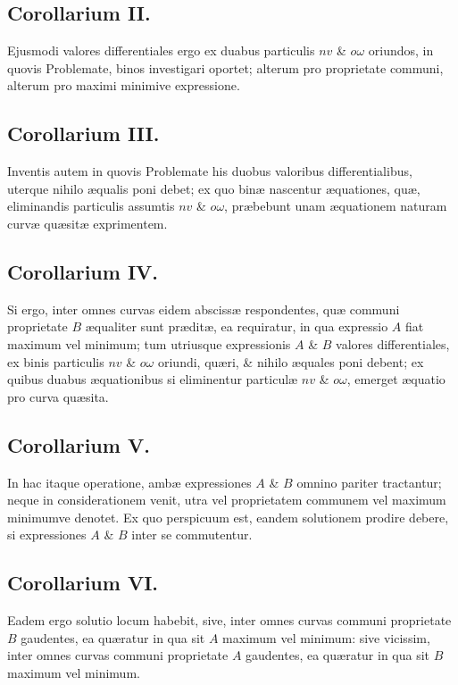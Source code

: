 \subsection*{Corollarium II.}
Ejusmodi valores differentiales ergo ex duabus particulis $nv$ \& $o\omega$ oriundos, in quovis Problemate, binos investigari oportet; alterum pro proprietate communi, alterum pro maximi minimive expressione.

\subsection*{Corollarium III.}
Inventis autem in quovis Problemate his duobus valoribus differentialibus, uterque nihilo æqualis poni debet; ex quo binæ nascentur æquationes, quæ, eliminandis particulis assumtis $nv$ \& $o\omega$, præbebunt unam æquationem naturam curvæ quæsitæ exprimentem.

\subsection*{Corollarium IV.}
Si ergo, inter omnes curvas eidem abscissæ respondentes, quæ communi proprietate $B$ æqualiter sunt præditæ, ea requiratur, in qua expressio $A$ fiat maximum vel minimum; tum utriusque expressionis $A$ \& $B$ valores differentiales, ex binis particulis $nv$ \& $o\omega$ oriundi, quæri, \& nihilo æquales poni debent; ex quibus duabus æquationibus si eliminentur particulæ $nv$ \& $o\omega$, emerget æquatio pro curva quæsita.

\subsection*{Corollarium V.}
In hac itaque operatione, ambæ expressiones $A$ \& $B$ omnino pariter tractantur; neque in considerationem venit, utra vel proprietatem communem vel maximum minimumve denotet. Ex quo perspicuum est, eandem solutionem prodire debere, si expressiones $A$ \& $B$ inter se commutentur.

\subsection*{Corollarium VI.}
Eadem ergo solutio locum habebit, sive, inter omnes curvas communi proprietate $B$ gaudentes, ea quæratur in qua sit $A$ maximum vel minimum: sive vicissim, inter omnes curvas communi proprietate $A$ gaudentes, ea quæratur in qua sit $B$ maximum vel minimum.

